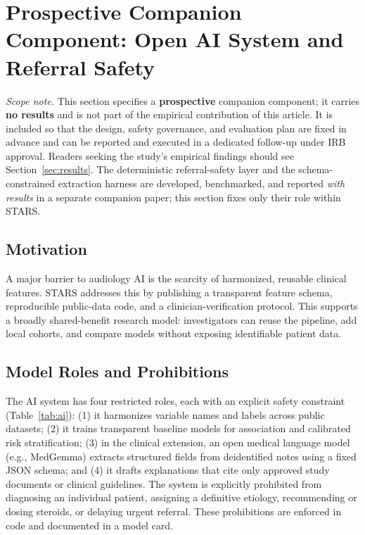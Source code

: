 \section{Prospective Companion Component: Open AI System and Referral Safety}
\label{sec:ai}
\noindent\emph{Scope note.} This section specifies a \textbf{prospective} companion component; it carries \textbf{no results} and is not part of the empirical contribution of this article. It is included so that the design, safety governance, and evaluation plan are fixed in advance and can be reported and executed in a dedicated follow-up under IRB approval. Readers seeking the study's empirical findings should see Section~\ref{sec:results}. The deterministic referral-safety layer and the schema-constrained extraction harness are developed, benchmarked, and reported \emph{with results} in a separate companion paper; this section fixes only their role within STARS.

\subsection{Motivation}
A major barrier to audiology AI is the scarcity of harmonized, reusable clinical features. STARS addresses this by publishing a transparent feature schema, reproducible public-data code, and a clinician-verification protocol. This supports a broadly shared-benefit research model: investigators can reuse the pipeline, add local cohorts, and compare models without exposing identifiable patient data.

\subsection{Model Roles and Prohibitions}
The AI system has four restricted roles, each with an explicit safety constraint (Table~\ref{tab:ai}): (1) it harmonizes variable names and labels across public datasets; (2) it trains transparent baseline models for association and calibrated risk stratification; (3) in the clinical extension, an open medical language model (e.g., MedGemma) extracts structured fields from deidentified notes using a fixed JSON schema; and (4) it drafts explanations that cite only approved study documents or clinical guidelines. The system is explicitly prohibited from diagnosing an individual patient, assigning a definitive etiology, recommending or dosing steroids, or delaying urgent referral. These prohibitions are enforced in code and documented in a model card.

